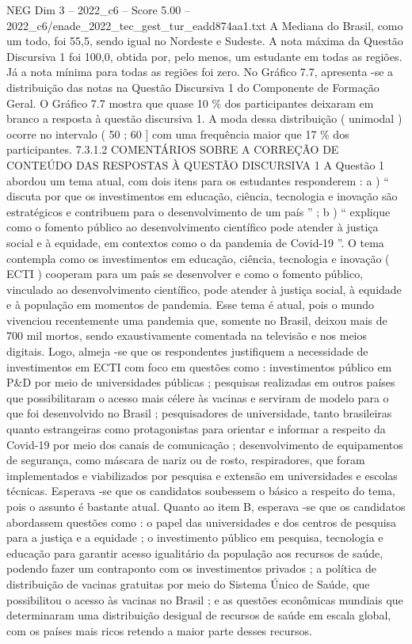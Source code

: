 \begin{textsample}{NEG Dim 3 – 2022\_c6 – Score 5.00 – 2022\_c6/enade\_2022\_tec\_gest\_tur\_eadd874aa1.txt}
A Mediana do Brasil, como um todo, foi 55,5, sendo igual no Nordeste e Sudeste.
A nota máxima da Questão Discursiva 1 foi 100,0, obtida por, pelo menos, um estudante em todas as regiões.
Já a nota mínima para todas as regiões foi zero.
No Gráfico 7.7, apresenta -se a distribuição das notas na Questão Discursiva 1 do Componente de Formação Geral.
O Gráfico 7.7 mostra que quase 10 \% dos participantes deixaram em branco a resposta à questão discursiva 1.
A moda dessa distribuição ( unimodal ) ocorre no intervalo ( 50 ; 60 ] com uma frequência maior que 17 \% dos participantes. 7.3.1.2 COMENTÁRIOS SOBRE A CORREÇÃO DE CONTEÚDO DAS RESPOSTAS À QUESTÃO DISCURSIVA 1 A Questão 1 abordou um tema atual, com dois itens para os estudantes responderem : a ) “ discuta por que os investimentos em educação, ciência, tecnologia e inovação são estratégicos e contribuem para o desenvolvimento de um país ” ; b ) “ explique como o fomento público ao desenvolvimento científico pode atender à justiça social e à equidade, em contextos como o da pandemia de Covid-19 ”.
O tema contempla como os investimentos em educação, ciência, tecnologia e inovação ( ECTI ) cooperam para um país se desenvolver e como o fomento público, vinculado ao desenvolvimento científico, pode atender à justiça social, à equidade e à população em momentos de pandemia.
Esse tema é atual, pois o mundo vivenciou recentemente uma pandemia que, somente no Brasil, deixou mais de 700 mil mortos, sendo exaustivamente comentada na televisão e nos meios digitais.
Logo, almeja -se que os respondentes justifiquem a necessidade de investimentos em ECTI com foco em questões como : investimentos público em P\&D por meio de universidades públicas ; pesquisas realizadas em outros países que possibilitaram o acesso mais célere às vacinas e serviram de modelo para o que foi desenvolvido no Brasil ; pesquisadores de universidade, tanto brasileiras quanto estrangeiras como protagonistas para orientar e informar a respeito da Covid-19 por meio dos canais de comunicação ; desenvolvimento de equipamentos de segurança, como máscara de nariz ou de rosto, respiradores, que foram implementados e viabilizados por pesquisa e extensão em universidades e escolas técnicas.
Esperava -se que os candidatos soubessem o básico a respeito do tema, pois o assunto é bastante atual.
Quanto ao item B, esperava -se que os candidatos abordassem questões como : o papel das universidades e dos centros de pesquisa para a justiça e a equidade ; o investimento público em pesquisa, tecnologia e educação para garantir acesso igualitário da população aos recursos de saúde, podendo fazer um contraponto com os investimentos privados ; a política de distribuição de vacinas gratuitas por meio do Sistema Único de Saúde, que possibilitou o acesso às vacinas no Brasil ; e as questões econômicas mundiais que determinaram uma distribuição desigual de recursos de saúde em escala global, com os países mais ricos retendo a maior parte desses recursos.

\end{textsample}
